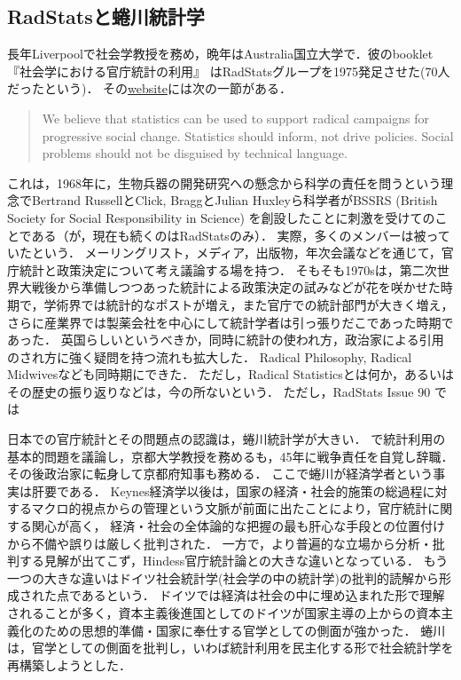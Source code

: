 \documentclass[uplatex,dvipdfmx]{jsreport}
\begin{document}
\subsection{RadStatsと蜷川統計学}

\begin{history}
    長年Liverpoolで社会学教授を務め，晩年はAustralia国立大学で．彼のbooklet 『社会学における官庁統計の利用』\cite{Hindess73}
    はRadStatsグループを1975発足させた(70人だったという\cite{RadStats05})．
    その\href{https://www.radstats.org.uk/}{website}には次の一節がある．
    \begin{quote}
        We believe that statistics can be used to support radical campaigns for
        progressive social change. Statistics should inform, not drive policies.
        Social problems should not be disguised by technical language.
    \end{quote}
    これは，1968年に，生物兵器の開発研究への懸念から科学の責任を問うという理念でBertrand RussellとClick, BraggとJulian Huxleyら科学者がBSSRS (British Society for Social Responsibility in Science)
    を創設したことに刺激を受けてのことである（が，現在も続くのはRadStatsのみ）．
    実際，多くのメンバーは被っていたという\cite{RadStats05}．
    メーリングリスト，メディア，出版物，年次会議などを通じて，官庁統計と政策決定について考え議論する場を持つ\cite{The_Radical_Statistics_Group}．
    そもそも1970sは，第二次世界大戦後から準備しつつあった統計による政策決定の試みなどが花を咲かせた時期で，学術界では統計的なポストが増え，また官庁での統計部門が大きく増え，
    さらに産業界では製薬会社を中心にして統計学者は引っ張りだこであった時期であった．
    英国らしいというべきか，同時に統計の使われ方，政治家による引用のされ方に強く疑問を持つ流れも拡大した．
    Radical Philosophy, Radical Midwivesなども同時期にできた．
    ただし，Radical Statisticsとは何か，あるいはその歴史の振り返りなどは，今の所ないという\cite{The_Radical_Statistics_Group}．
    ただし，RadStats Issue 90 \cite{RadStats05}では
\end{history}

\begin{history}[蜷川虎三 97-81]
    日本での官庁統計とその問題点の認識は，蜷川統計学が大きい．
    \cite{蜷川虎三-PhD}で統計利用の基本的問題を議論し，京都大学教授を務めるも，45年に戦争責任を自覚し辞職．
    その後政治家に転身して京都府知事も務める．
    ここで蜷川が経済学者という事実は肝要である．
    Keynes経済学以後は，国家の経済・社会的施策の総過程に対するマクロ的視点からの管理という文脈が前面に出たことにより，官庁統計に関する関心が高く，
    経済・社会の全体論的な把握の最も肝心な手段との位置付けから不備や誤りは厳しく批判された．
    一方で，より普遍的な立場から分析・批判する見解が出てこず，Hindess官庁統計論との大きな違いとなっている\cite{統計と社会経済分析2-思想と方法}．
    もう一つの大きな違いはドイツ社会統計学(社会学の中の統計学)の批判的読解から形成された点であるという．
    ドイツでは経済は社会の中に埋め込まれた形で理解されることが多く，資本主義後進国としてのドイツが国家主導の上からの資本主義化のための思想的準備・国家に奉仕する官学としての側面が強かった．
    蜷川は，官学としての側面を批判し，いわば統計利用を民主化する形で社会統計学を再構築しようとした．
\end{history}
\end{document}
